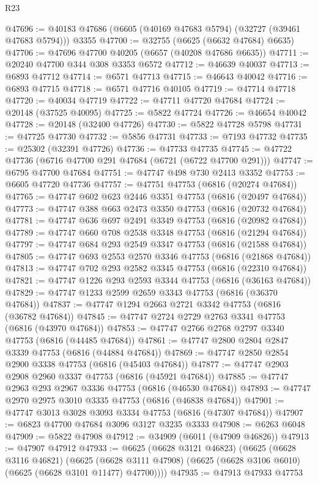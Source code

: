\begin{lexlean}{R23}
\begin{coremodule}
@47696 := @40183 @47686 (@6605 (@40169 @47683 @5794) (@32727 (@39461 @47683 @5794))) @3355
@47700 := @32755 (@6625 (@6632 @47684) @6635)
@47706 := @47696 @47700 @40205 (@6657 (@40208 @47686 @6635))
@47711 := @20240 @47700 @344 @308 @3353 @6572
@47712 := @46639 @40037
@47713 := @6893 @47712
@47714 := @6571 @47713
@47715 := @46643 @40042
@47716 := @6893 @47715
@47718 := @6571 @47716 @40105
@47719 := @47714 @47718
@47720 := @40034 @47719
@47722 := @47711 @47720 @47684
@47724 := @20148 (@37525 @40095)
@47725 := @5822 @47724
@47726 := @46654 @40042
@47728 := @20148 (@32400 @47726)
@47730 := @5822 @47728 @5798
@47731 := @47725 @47730
@47732 := @5856 @47731
@47733 := @7193 @47732
@47735 := @25302 (@32391 @47726)
@47736 := @47733 @47735
@47745 := @47722 @47736 (@6716 @47700 @291 @47684 (@6721 (@6722 @47700 @291)))
@47747 := @6795 @47700 @47684
@47751 := @47747 @498 @730 @2413 @3352
@47753 := @6605 @47720 @47736
@47757 := @47751 @47753 (@6816 (@20274 @47684))
@47765 := @47747 @602 @623 @2446 @3351 @47753 (@6816 (@20497 @47684))
@47773 := @47747 @388 @663 @2473 @3350 @47753 (@6816 (@20732 @47684))
@47781 := @47747 @636 @697 @2491 @3349 @47753 (@6816 (@20982 @47684))
@47789 := @47747 @660 @708 @2538 @3348 @47753 (@6816 (@21294 @47684))
@47797 := @47747 @684 @293 @2549 @3347 @47753 (@6816 (@21588 @47684))
@47805 := @47747 @693 @2553 @2570 @3346 @47753 (@6816 (@21868 @47684))
@47813 := @47747 @702 @293 @2582 @3345 @47753 (@6816 (@22310 @47684))
@47821 := @47747 @1226 @293 @2593 @3344 @47753 (@6816 (@36163 @47684))
@47829 := @47747 @1233 @2599 @2659 @3343 @47753 (@6816 (@36370 @47684))
@47837 := @47747 @1294 @2663 @2721 @3342 @47753 (@6816 (@36782 @47684))
@47845 := @47747 @2724 @2729 @2763 @3341 @47753 (@6816 (@43970 @47684))
@47853 := @47747 @2766 @2768 @2797 @3340 @47753 (@6816 (@44485 @47684))
@47861 := @47747 @2800 @2804 @2847 @3339 @47753 (@6816 (@44884 @47684))
@47869 := @47747 @2850 @2854 @2900 @3338 @47753 (@6816 (@45403 @47684))
@47877 := @47747 @2903 @2908 @2960 @3337 @47753 (@6816 (@45921 @47684))
@47885 := @47747 @2963 @293 @2967 @3336 @47753 (@6816 (@46530 @47684))
@47893 := @47747 @2970 @2975 @3010 @3335 @47753 (@6816 (@46838 @47684))
@47901 := @47747 @3013 @3028 @3093 @3334 @47753 (@6816 (@47307 @47684))
@47907 := @6823 @47700 @47684 @3096 @3127 @3235 @3333
@47908 := @6263 @6048
@47909 := @5822 @47908
@47912 := @34909 (@6011 (@47909 @46826))
@47913 := @47907 @47912
@47933 := @6625
    (@6628 @3121 @46823)
    (@6625
      (@6628 @3116 @46821)
      (@6625 (@6628 @3111 @47908) (@6625 (@6628 @3106 @6010) (@6625 (@6628 @3101 @11477) @47700))))
@47935 := @47913 @47933 @47753

\end{coremodule}
\end{lexlean}
